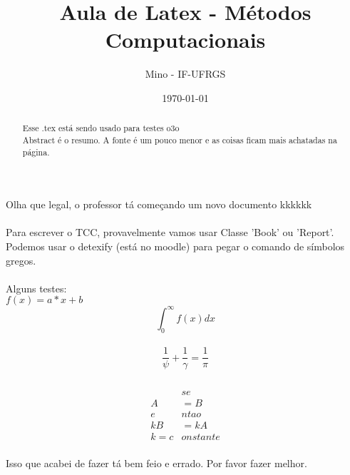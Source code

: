 \documentclass[a4paper,12pt]{article}
\title{Aula de Latex - Métodos Computacionais}
\author{Mino - IF-UFRGS}
\date{\today}
\begin{document}
\maketitle
\begin{abstract}
	Esse .tex está sendo usado para testes o3o
	\\Abstract é o resumo. A fonte é um pouco menor
	e as coisas ficam mais achatadas na página.
\end{abstract}

Olha que legal, o professor tá começando um novo documento kkkkkk
\\
\\Para escrever o TCC, provavelmente vamos usar Classe 'Book' ou 'Report'.
\\Podemos usar o detexify (está no moodle) para pegar o comando de símbolos gregos.
\\
\\Alguns testes:
\\
$f(x) = a*x + b$
\\
\begin{equation}
	\int_{0}^{\infty}f(x)dx
	\label{eq1}
\end{equation}
\\
\[\frac{1}{\psi} + \frac{1}{\gamma} = \frac{1}{\pi}\]
\\
\begin{align*}
\\&se
\\A &= B
\\ e&ntao
\\kB &= kA
\\k = c&onstante
\end{align*}
\\Isso que acabei de fazer tá bem feio e errado. Por favor fazer melhor.
\end{document}
